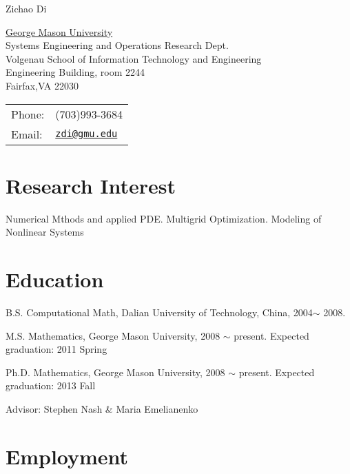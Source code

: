 \documentclass[letterpaper]{article}
\def\name{Zichao Di}
\renewenvironment{itemize}{
  \begin{list}{}{
    \setlength{\leftmargin}{1.5em}
  }
}{
  \end{list}
}
\begin{document}
{\huge \name}


\vspace{0.25in}

\begin{minipage}{0.65\linewidth}
  \href{http://www.gmu.edu/}{George Mason University} \\
  Systems Engineering and Operations Research Dept. \\
  Volgenau School of Information Technology and Engineering \\
Engineering Building, room 2244\\
  Fairfax,VA 22030
\end{minipage}
\begin{minipage}{0.45\linewidth}
  \begin{tabular}{ll}
    Phone: & (703)993-3684 \\
    Email: & \href{mailto:zdi@gmu.edu}{\tt zdi@gmu.edu} \\
  \end{tabular}
\end{minipage}

\section*{Research Interest}
Numerical Mthods and applied PDE. Multigrid Optimization. Modeling of Nonlinear Systems


\section*{Education}

\begin{itemize}
  \item B.S. Computational Math, Dalian University of Technology, China, 2004$ \sim$ 2008.
  \item M.S. Mathematics, George Mason University, 2008 $ \sim$ present. Expected graduation: 2011 Spring

  \item Ph.D. Mathematics, George Mason University, 2008 $ \sim$ present. Expected graduation: 2013 Fall
\item Advisor: Stephen Nash \& Maria Emelianenko
\end{itemize}


\section*{Employment}
\end{document}
